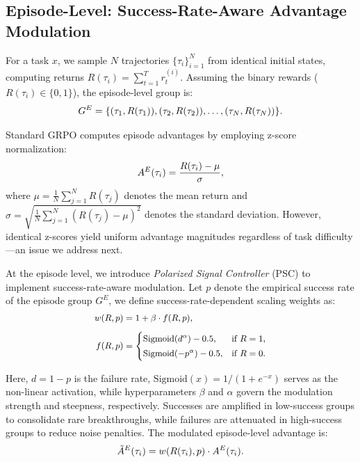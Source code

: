 \documentclass[11pt]{article}
\begin{document}
\subsection{Episode-Level: Success-Rate-Aware Advantage Modulation}
\label{sec:episode_level}

For a task $x$, we sample $N$ trajectories $\{\tau_i\}_{i=1}^N$ from identical initial states, computing returns $R(\tau_i) = \sum_{t=1}^T r_t^{(i)}$. Assuming the binary rewards ($R(\tau_i) \in \{0, 1\}$), the episode-level group is:
\begin{equation}
\small
\label{eq:episode_group}
G^E = \{(\tau_1, R(\tau_1)), (\tau_2, R(\tau_2)), \ldots, (\tau_N, R(\tau_N))\}.
\end{equation}

Standard GRPO computes episode advantages by employing z-score normalization:
\begin{equation}
\small
\label{eq:episode_adv}
A^E(\tau_i) = \frac{R(\tau_i) - \mu}{\sigma},
\end{equation}
where $\mu = \frac{1}{N}\sum_{j=1}^N R(\tau_j)$ denotes the mean return and $\sigma = \sqrt{\frac{1}{N}\sum_{j=1}^N (R(\tau_j) - \mu)^2}$ denotes the standard deviation. However, identical z-scores yield uniform advantage magnitudes regardless of task difficulty—an issue we address next.

At the episode level, we introduce \textit{Polarized Signal Controller} (PSC) to implement success-rate-aware modulation. Let $p$ denote the empirical success rate of the episode group $G^E$, we define success-rate-dependent scaling weights as:
\begin{equation}
\small
\label{eq:psc}
\begin{aligned}
w(R, p) &= 1 + \beta \cdot f(R, p), \\[4pt]
f(R, p) &= \begin{cases}
\text{Sigmoid}(d^\alpha) - 0.5, & \text{if } R = 1, \\[2pt]
\text{Sigmoid}(-p^\alpha) - 0.5, & \text{if } R = 0.
\end{cases}
\end{aligned}
\end{equation}

Here, $d = 1 - p$ is the failure rate, $\text{Sigmoid}(x) = 1/(1 + e^{-x})$ serves as the non-linear activation, while hyperparameters $\beta$ and $\alpha$ govern the modulation strength and steepness, respectively. Successes are amplified in low-success groups to consolidate rare breakthroughs, while failures are attenuated in high-success groups to reduce noise penalties. The modulated episode-level advantage is:
\begin{equation}
\small
\label{eq:episode_adv_modulated}
\tilde{A}^E(\tau_i) = w(R(\tau_i), p) \cdot A^E(\tau_i).
\end{equation}
\end{document}
